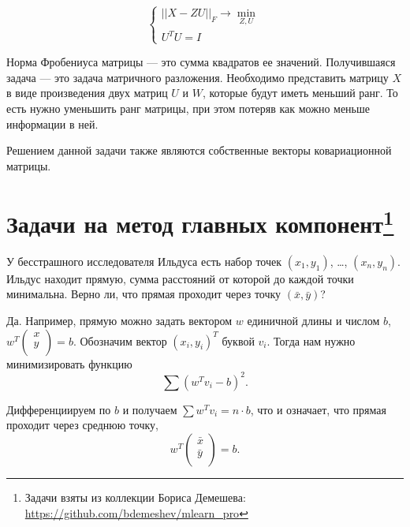\documentclass[12pt,fleqn]{article}
\begin{document}
$$
\begin{cases} 
||X - ZU||_F \to \min_{Z,U} \\
U^TU = I
\end{cases} 
$$

Норма Фробениуса матрицы — это сумма квадратов ее значений. Получившаяся задача  --- это задача матричного разложения. Необходимо представить матрицу $X$ в виде
произведения двух матриц $U$ и $W$, которые будут иметь меньший ранг. То есть нужно уменьшить ранг матрицы, при этом потеряв как можно меньше информации в ней.

Решением данной задачи также являются собственные векторы ковариационной матрицы.


\section{Задачи на метод главных компонент\footnote{Задачи взяты из коллекции Бориса Демешева: \url{https://github.com/bdemeshev/mlearn_pro}}}


\begin{vkProblem} 
У бесстрашного исследователя Ильдуса есть набор точек $(x_1, y_1)$, \ldots, $(x_n, y_n)$. Ильдус находит прямую, сумма расстояний от которой до каждой точки минимальна. Верно ли, что прямая проходит через точку $(\bar x, \bar y)$?
\end{vkProblem}
\begin{esSolution}
Да. Например, прямую можно задать вектором $w$ единичной длины и числом $b$,
$w^T \begin{pmatrix}
x \\
y \\
\end{pmatrix} = b$.
Обозначим вектор $(x_i, y_i)^T$ буквой $v_i$.
Тогда нам нужно минимизировать функцию
\[
\sum (w^T v_i - b)^2.
\]

Дифференциируем по $b$ и получаем $\sum w^T v_i = n\cdot b$,
что и означает, что прямая проходит через среднюю точку,
\[
w^T \begin{pmatrix}
\bar x \\
\bar y \\
\end{pmatrix} = b.
\]
\end{esSolution}
\end{document}
